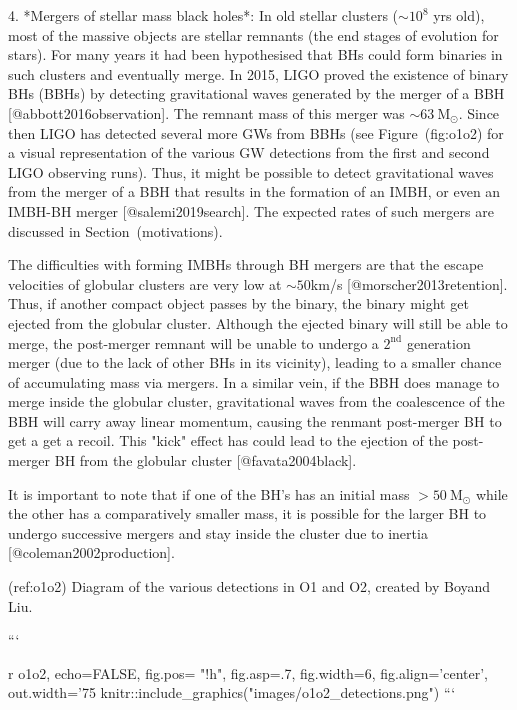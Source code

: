 {{{{{{{{{{{{4. *Mergers of stellar mass black holes*:
    In old stellar clusters ($\sim10^8$ yrs old), most of the massive
    objects are stellar remnants (the end stages of evolution for
    stars). For many years it had been hypothesised that BHs could form
    binaries in such clusters and eventually merge. In 2015, LIGO proved
    the existence of binary BHs (BBHs) by detecting gravitational waves
    generated by the merger of a BBH [@abbott2016observation]. The
    remnant mass of this merger was $\sim63\ \text{M}_{\odot}$. Since
    then LIGO has detected several more GWs from BBHs (see
    Figure~\@ref(fig:o1o2) for a visual representation of the various GW
    detections from the first and second LIGO observing runs). Thus, it
    might be possible to detect gravitational waves from the merger of a
    BBH that results in the formation of an IMBH, or even an IMBH-BH
    merger [@salemi2019search]. The expected rates of such mergers are
    discussed in Section~\@ref(motivations).

    The difficulties with forming IMBHs through BH mergers are that the
    escape velocities of globular clusters are very low at $\sim50$km/s
    [@morscher2013retention]. Thus, if another compact object passes by
    the binary, the binary might get ejected from the globular cluster.
    Although the ejected binary will still be able to merge, the
    post-merger remnant will be unable to undergo a $2^{\text{nd}}$
    generation merger (due to the lack of other BHs in its vicinity),
    leading to a smaller chance of accumulating mass via mergers.  In a
    similar vein, if the BBH does manage to merge inside the globular
    cluster, gravitational waves from the coalescence of the BBH  will
    carry away linear momentum, causing the renmant post-merger BH to
    get a get a recoil. This "kick" effect has could lead to the
    ejection of the post-merger BH from the globular cluster
    [@favata2004black].

    It is important to note that if one of the BH's has an initial mass
    $>50 \ \text{M}_{\odot}$ while the other has a comparatively smaller
    mass, it is possible for the larger BH to undergo successive mergers
    and stay inside the cluster due to inertia [@coleman2002production].

(ref:o1o2) Diagram of the various detections in O1 and O2, created by Boyand Liu.

```{r o1o2, echo=FALSE, fig.pos= "!h", fig.asp=.7, fig.width=6, fig.align='center', out.width='75%
knitr::include_graphics("images/o1o2_detections.png")
```




}}}}}}}}}}}}}
